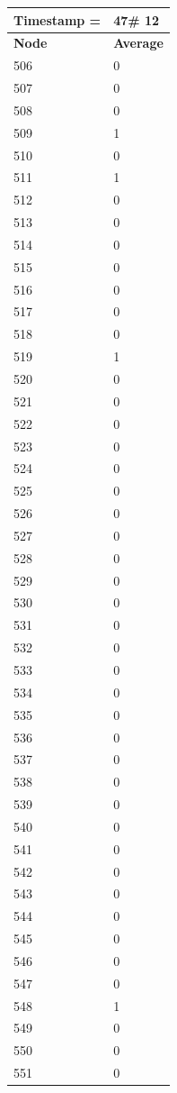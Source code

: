 \begin{tabular}{|l||l|}
\hline
\textbf{Timestamp =} & \textbf{47}\# 12\\\hline
	\textbf{Node} & \textbf{Average} \\ \hline
\hline
	506 & 0 \\ \hline
	507 & 0 \\ \hline
	508 & 0 \\ \hline
	509 & 1 \\ \hline
	510 & 0 \\ \hline
	511 & 1 \\ \hline
	512 & 0 \\ \hline
	513 & 0 \\ \hline
	514 & 0 \\ \hline
	515 & 0 \\ \hline
	516 & 0 \\ \hline
	517 & 0 \\ \hline
	518 & 0 \\ \hline
	519 & 1 \\ \hline
	520 & 0 \\ \hline
	521 & 0 \\ \hline
	522 & 0 \\ \hline
	523 & 0 \\ \hline
	524 & 0 \\ \hline
	525 & 0 \\ \hline
	526 & 0 \\ \hline
	527 & 0 \\ \hline
	528 & 0 \\ \hline
	529 & 0 \\ \hline
	530 & 0 \\ \hline
	531 & 0 \\ \hline
	532 & 0 \\ \hline
	533 & 0 \\ \hline
	534 & 0 \\ \hline
	535 & 0 \\ \hline
	536 & 0 \\ \hline
	537 & 0 \\ \hline
	538 & 0 \\ \hline
	539 & 0 \\ \hline
	540 & 0 \\ \hline
	541 & 0 \\ \hline
	542 & 0 \\ \hline
	543 & 0 \\ \hline
	544 & 0 \\ \hline
	545 & 0 \\ \hline
	546 & 0 \\ \hline
	547 & 0 \\ \hline
	548 & 1 \\ \hline
	549 & 0 \\ \hline
	550 & 0 \\ \hline
	551 & 0 \\ \hline
\end{tabular}

